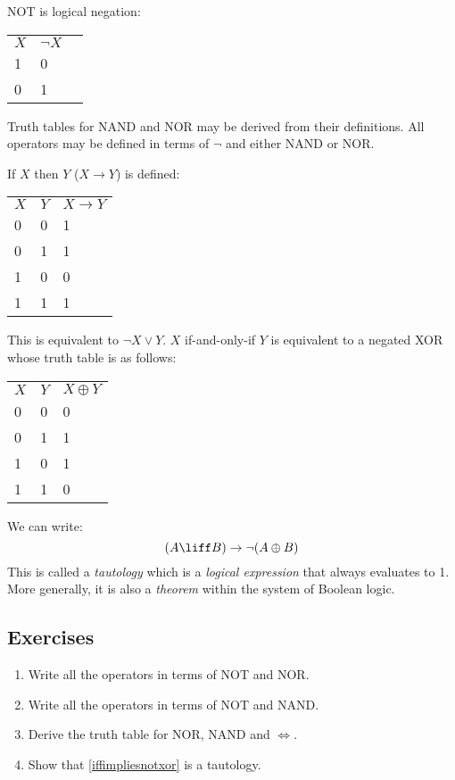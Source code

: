 \documentclass{article}
\begin{document}
NOT is logical negation:
\begin{tabular}{lll}
	$X$ & $\lnot X$ \\
	 1 & 0 \\
	 0 & 1 \\
	\hline
\end{tabular}

Truth tables for NAND and NOR may be derived from their definitions.
All operators may be defined in terms of $\lnot$ and either
NAND or NOR.

If $X$ then $Y$ ($X \rightarrow Y$) is defined:
\begin{tabular}{lll}
	$X$ & $Y$ & $X \rightarrow Y$ \\
	0 & 0 & 1 \\
	0 & 1 & 1 \\
	1 & 0 & 0 \\
	1 & 1 & 1 \\
	\hline
\end{tabular}
This is equivalent to $\lnot X \lor Y$.
$X$ if-and-only-if $Y$ is equivalent to a negated XOR whose truth table is
as follows:
\begin{tabular}{lll}
	$X$ & $Y$ & $X \oplus Y$ \\
	0 & 0 & 0 \\
	0 & 1 & 1 \\
	1 & 0 & 1 \\
	1 & 1 & 0 \\
	\hline
\end{tabular}

We can write:
\begin{equation}
	(A \liff B) \rightarrow \lnot (A \oplus B)
	\label{iffimpliesnotxor}
\end{equation}
This is called a {\it tautology} which is a {\it logical expression} that
always evaluates to 1.
More generally, it is also a {\it theorem} within the system of Boolean
logic.

\subsection{Exercises}

\begin{enumerate}
	\item Write all the operators in terms of NOT and NOR.
	\item Write all the operators in terms of NOT and NAND.
	\item Derive the truth table for NOR, NAND and $\iff$.
	\item Show that \ref{iffimpliesnotxor} is a tautology.
\end{enumerate}
\end{document}
